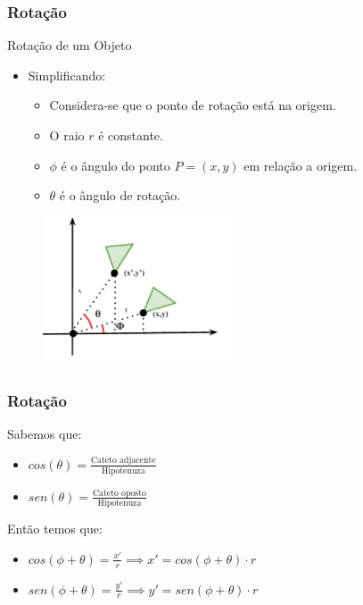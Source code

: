 \documentclass[fleqn]{beamer}
\begin{document}
\begin{frame}
\frametitle{Rotação}


	\begin{block}{Rotação de um Objeto}
		\begin{itemize}
			\item Simplificando:
			\begin{itemize}
				\item Considera-se que o ponto de rotação está na origem.
				\item O raio $r$ é constante.
				\item $\phi$ é o ângulo do ponto $P = (x,y)$ em relação a origem.
				\item $\theta$ é o ângulo de rotação.
			\end{itemize}
		\end{itemize}
	\end{block}
	
	\begin{figure}[!h]
			\begin{center}
			\includegraphics[width=0.5\textwidth]{Figures/ExemploRotacao2}
			\end{center}
	\end{figure}
	
\end{frame}


\begin{frame}
\frametitle{Rotação}

	\begin{block}{Sabemos que:}
		\begin{itemize}
			\item $cos(\theta) = \frac{\text{Cateto adjacente}}{\text{Hipotenuza}}$
			\item $sen(\theta) = \frac{\text{Cateto oposto}}{\text{Hipotenuza}}$
		\end{itemize}
	\end{block}

	\begin{block}{Então temos que:}
		\begin{itemize}
			\item $cos(\phi + \theta) = \frac{x'}{r} \implies x' = cos(\phi + \theta)\cdot r$
			\item $sen(\phi + \theta) = \frac{y'}{r} \implies y' = sen(\phi + \theta)\cdot r$
		\end{itemize}
	\end{block}
	
\end{frame}
\end{document}
